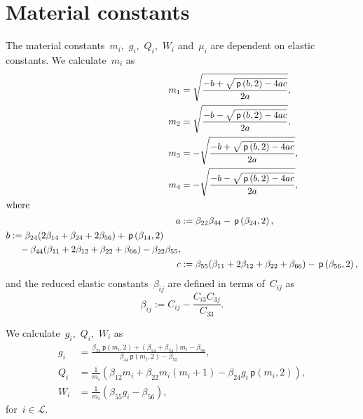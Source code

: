 \documentclass[preprint,10pt,times]{elsarticle}
\numberwithin{equation}{section}
\newcommand{\pr}[1]{\left( #1 \right)}
\newcommand{\p}{\,\mathsf{p}}
\renewcommand{\>}{$\Rightarrow$}
\begin{document}
\newpage
\appendix

\section{Material constants}
\label{Appen:MatConst}
The material constants~$m_i$,~$g_i$,~$Q_i$,~$W_i$ and~$\mu_i$ are dependent on elastic constants.
We calculate~$m_i$ as
\begin{subequations}
	\begin{align}
	 m_1 & =  \sqrt{\frac{-b +\sqrt{\p\pr{b,2} - 4ac}}{2a}}, \\
	 m_2 & =  \sqrt{\frac{-b -\sqrt{\p\pr{b,2} - 4ac}}{2a}}, \\
	 m_3 & =  -\sqrt{\frac{-b +\sqrt{\p\pr{b,2} - 4ac}}{2a}}, \\
	 m_4 & =  -\sqrt{\frac{-b -\sqrt{\p\pr{b,2} - 4ac}}{2a}}, \\
	\intertext{where}
	 a & :=  \beta_{22} \beta_{44} - \p\pr{\beta_{24},2}, \\
	\begin{split}
	 b & := \beta_{24}(2\beta_{14} + \beta_{24} + 2\beta_{56}) + \p\pr{\beta_{14},2} \\
	 & \quad - \beta_{44}(\beta_{11} + 2\beta_{12} + \beta_{22} + \beta_{66}) - \beta_{22} \beta_{55},
	\end{split} \\
	c & :=  \beta_{55}(\beta_{11} + 2\beta_{12} + \beta_{22} + \beta_{66})-\p\pr{\beta_{56},2},
	\end{align}
\end{subequations}
and the reduced elastic constants~$\beta_{ij}$ are defined in terms of~$C_{ij}$ as
\begin{equation}
\beta_{ij} := C_{ij}-\frac{C_{i3} C_{3j}}{C_{33}}.
\end{equation}


We calculate~$g_i$,~$Q_i$,~$W_i$ as
\begin{subequations}
	\begin{align}
	g_i & = \frac{\beta_{24}\p\pr{m_i,2}+(\beta_{14} + \beta_{24})m_i - \beta_{56}}{\beta_{44}\p\pr{m_i,2} - \beta_{55}}, \\
	Q_i & = \frac{1}{m_i} \pr{\beta_{12}m_i + \beta_{22}m_i(m_i+1) - \beta_{24} g_i \p\pr{m_i,2}}, \\
	W_i & = \frac{1}{m_i}\pr{\beta_{55} g_i - \beta_{56}},
	\end{align}
\end{subequations}
for~$ i \in \mathcal{L}$.
\end{document}
